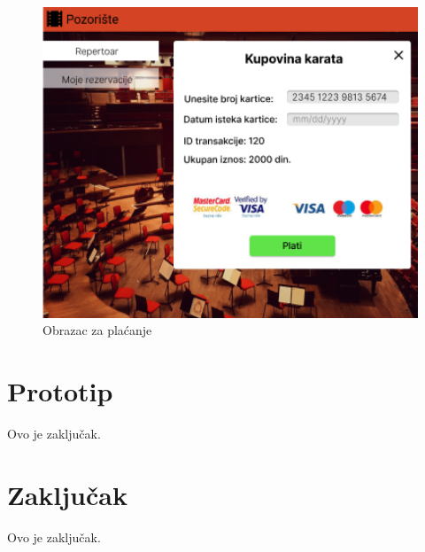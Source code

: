 \documentclass[a4paper]{article}
\begin{document}
\begin{figure}[H]
  \begin{center}
    \includegraphics[width=130mm]{../images/ui_klijent_kupovina2.png}
  \end{center}
  \caption{Obrazac za plaćanje}
  \label{klijent_plaćanje}
\end{figure}

\section{Prototip}
Ovo je zaključak.

\section{Zaključak}
Ovo je zaključak.

\newpage

\appendix
 

\end{document}
